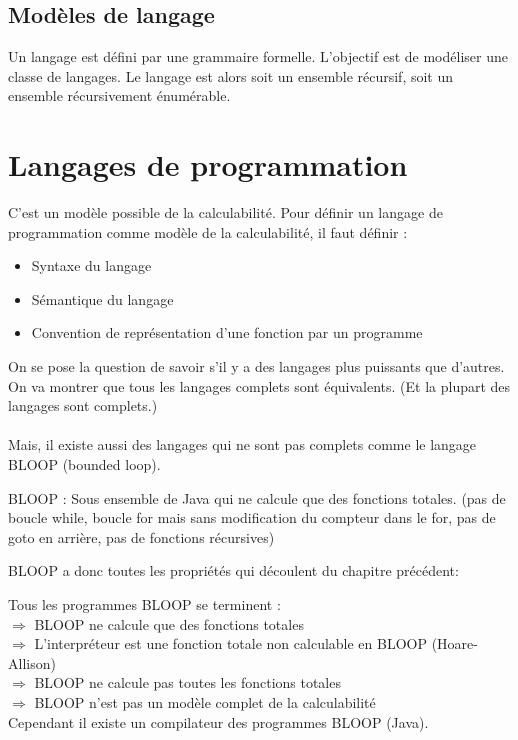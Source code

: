 \subsection{Modèles de langage}
\label{ssub:mod_le_de_langage}
Un langage est défini par une grammaire formelle. L'objectif est de modéliser
une classe de langages. Le langage est alors soit un ensemble récursif, soit un
ensemble récursivement énumérable.


\section{Langages de programmation}
\label{sub:langages_de_programmation}
C'est un modèle possible de la calculabilité. Pour définir un langage de
programmation comme modèle de la calculabilité, il faut définir :
\begin{itemize}
	\item Syntaxe du langage
	\item Sémantique du langage
	\item Convention de représentation d'une fonction par un programme
\end{itemize}

On se pose la question de savoir s'il y a des langages plus puissants que
d'autres. On va montrer que tous les langages complets sont équivalents. (Et la
plupart des langages sont complets.)

\paragraph{} Mais, il existe aussi des langages qui ne sont pas complets comme le
langage BLOOP (bounded loop).

\begin{mydef}
	BLOOP : Sous ensemble de Java qui ne calcule que des fonctions totales.
	(pas de boucle while, boucle for mais sans modification du compteur
	dans le for, pas de goto en arrière, pas de fonctions récursives)
\end{mydef}

BLOOP a donc toutes les propriétés qui découlent du chapitre précédent:

\begin{myprop}
Tous les programmes BLOOP se terminent :\\
    $ \Rightarrow$ BLOOP ne calcule que des fonctions totales\\
    $ \Rightarrow$ L'interpréteur est une fonction totale non calculable en
BLOOP (Hoare-Allison)\\
    $ \Rightarrow$ BLOOP ne calcule pas toutes les fonctions totales\\
    $ \Rightarrow$ BLOOP n'est pas un modèle complet de la calculabilité\\

Cependant il existe un compilateur des programmes BLOOP (Java).\\
\end{myprop}

